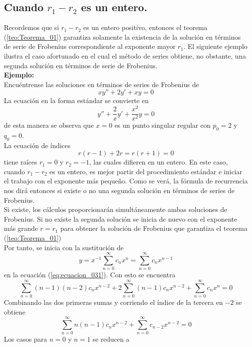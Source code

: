 \subsection{Cuando $r_{1}-r_{2}$ es un entero.}
Recordemos que si $r_{1} - r_{2}$ es un entero positivo, entonces el teorema (\ref{teo:Teorema_01}) garantiza solamente la existencia de la solución en términos de serie de Frobenius correspondiente al exponente mayor $r_{1}$. El siguiente ejemplo ilustra el caso afortunado en el cual el método de series obtiene, no obstante, una segunda solución en términos de serie de Frobenius.
\\
\textbf{Ejemplo:}
\\
Encuéntrense las soluciones en términos de series de Frobenius de
\begin{equation}
x y'' + 2 y' + xy = 0
\label{eq:ecuacion_031}
\end{equation}
La ecuación en la forma estándar se convierte en
\[ y'' + \dfrac{2}{x} y' + \dfrac{x^{2}}{x^{2}} y = 0 \]
de esta manera se observa que $x = 0$ es un punto singular regular con $p_{0} = 2$ y $q_{0} = 0$.
\\
La ecuación de índices
\[ r(r - 1) + 2r = r(r + 1) = 0 \]
tiene raíces $r_{1} = 0$ y $r_{2} = -1$, las cuales difieren en un entero. En este caso, cuando $r_{1} - r_{2}$ es un entero, es mejor partir del procedimiento estándar e iniciar el trabajo con el exponente más pequeño. Como se verá, la fórmula de recurrencia nos dirá entonces si existe o no una segunda solución en términos de series de Frobenius.
\\
Si existe, los cálculos proporcionarán simultáneamente ambas soluciones de Frobenius. Si no existe la segunda solución se inicia de nuevo con el exponente más grande $r = r_{1}$ para obtener la solución de Frobenius que garantiza el teorema (\ref{teo:Teorema_01})
\\
Por tanto, se inicia con la sustitución de
\[ y = x^{-1} \sum_{n=0}^{\infty} c_{n} x^{n} = \sum_{n=0}^{\infty} c_{n} x^{n-1}  \]
en la ecuación (\ref{eq:ecuacion_031}). Con esto se encuentra
\[ \sum_{n=0}^{\infty}(n-1)(n-2) c_{n} x^{n-2} +  2 \sum_{n=0}^{\infty} (n-1) c_{n} x^{n-2} + \sum_{n=0}^{\infty} c_{n} x^{n} = 0 \]
Combinando las dos primeras sumas y corriendo el índice de la tercera en $-2$ se obtiene
\begin{equation}
\sum_{n=0}^{\infty} n(n-1) c_{n} x^{n-2} + \sum_{n=0}^{\infty} c_{n-2} x^{n-2} = 0
\label{eq:ecuacion_032}
\end{equation}
Los casos para $n = 0$ y $n = 1$ se reducen a
